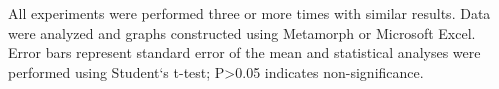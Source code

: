 All experiments were performed three or more times with similar results.
Data were analyzed and graphs constructed using Metamorph or Microsoft Excel.
Error bars represent standard error of the mean and statistical analyses were performed using Student`s t-test; P>0.05 indicates non-significance.